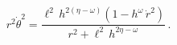 \begin{equation} \label{angvelocity}
r^2  \dot{\theta}^2 = \frac{\ell^2 \, h^{2(\eta - \omega)}(1 -
h^\omega \, \dot{r}^2)}{r^2 + \ell^2 \, h^{2\eta - \omega}} \, .
\end{equation}

